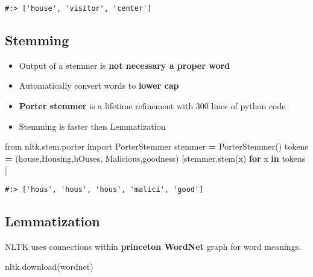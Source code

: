 \documentclass[
]{book}
\newenvironment{Shaded}{\begin{snugshade}}{\end{snugshade}}
\newcommand{\ControlFlowTok}[1]{\textcolor[rgb]{0.27,0.27,0.27}{\textbf{#1}}}
\newcommand{\ImportTok}[1]{#1}
\newcommand{\KeywordTok}[1]{\textcolor[rgb]{0.27,0.27,0.27}{\textbf{#1}}}
\newcommand{\NormalTok}[1]{#1}
\newcommand{\OperatorTok}[1]{\textcolor[rgb]{0.43,0.43,0.43}{\textbf{#1}}}
\newcommand{\StringTok}[1]{\textcolor[rgb]{0.5,0.5,0.5}{#1}}
\providecommand{\tightlist}{%
  \setlength{\itemsep}{0pt}\setlength{\parskip}{0pt}}
\begin{document}
\begin{verbatim}
#:> ['house', 'visitor', 'center']
\end{verbatim}

\hypertarget{stemming}{%
\subsection{Stemming}\label{stemming}}

\begin{itemize}
\tightlist
\item
  Output of a stemmer is \textbf{not necessary a proper word}
\item
  Automatically convert words to \textbf{lower cap}
\item
  \textbf{Porter stemmer} is a lifetime refinement with 300 lines of python code\\
\item
  Stemming is faster then Lemmatization
\end{itemize}

\begin{Shaded}
\begin{Highlighting}[]
\ImportTok{from}\NormalTok{ nltk.stem.porter }\ImportTok{import}\NormalTok{ PorterStemmer}
\NormalTok{stemmer }\OperatorTok{=}\NormalTok{ PorterStemmer()}
\NormalTok{tokens }\OperatorTok{=}\NormalTok{ (}\StringTok{\textquotesingle{}house\textquotesingle{}}\NormalTok{,}\StringTok{\textquotesingle{}Housing\textquotesingle{}}\NormalTok{,}\StringTok{\textquotesingle{}hOuses\textquotesingle{}}\NormalTok{, }\StringTok{\textquotesingle{}Malicious\textquotesingle{}}\NormalTok{,}\StringTok{\textquotesingle{}goodness\textquotesingle{}}\NormalTok{)}
\NormalTok{[stemmer.stem(x) }\ControlFlowTok{for}\NormalTok{ x }\KeywordTok{in}\NormalTok{ tokens ]}
\end{Highlighting}
\end{Shaded}

\begin{verbatim}
#:> ['hous', 'hous', 'hous', 'malici', 'good']
\end{verbatim}

\hypertarget{lemmatization}{%
\subsection{Lemmatization}\label{lemmatization}}

NLTK uses connections within \textbf{princeton WordNet} graph for word meanings.

\begin{Shaded}
\begin{Highlighting}[]
\NormalTok{nltk.download(}\StringTok{\textquotesingle{}wordnet\textquotesingle{}}\NormalTok{)}
\end{Highlighting}
\end{Shaded}
\end{document}
